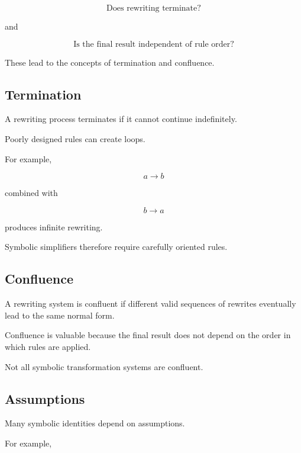\[
\boxed{
\text{Does rewriting terminate?}
}
\]

and

\[
\boxed{
\text{Is the final result independent of rule order?}
}
\]

These lead to the concepts of termination and confluence.

\subsection{Termination}
\label{subsec:rewriting-termination}

A rewriting process terminates if it cannot continue indefinitely.

Poorly designed rules can create loops.

For example,

\[
a
\longrightarrow
b
\]

combined with

\[
b
\longrightarrow
a
\]

produces infinite rewriting.

Symbolic simplifiers therefore require carefully oriented rules.

\subsection{Confluence}
\label{subsec:rewriting-confluence}

A rewriting system is confluent if different valid sequences of
rewrites eventually lead to the same normal form.

Confluence is valuable because the final result does not depend on the
order in which rules are applied.

Not all symbolic transformation systems are confluent.

\subsection{Assumptions}
\label{subsec:symbolic-assumptions}

Many symbolic identities depend on assumptions.

For example,

